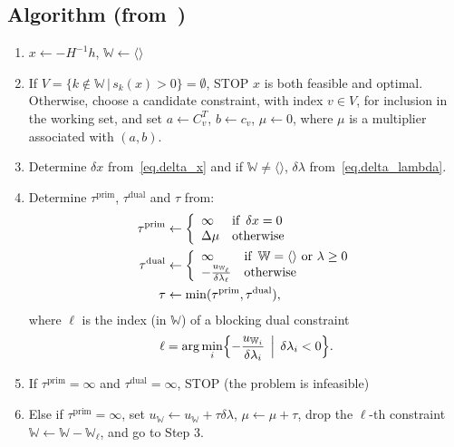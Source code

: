 \documentclass[12pt,a4paper]{article}
\begin{document}
\subsection{Algorithm (from~\cite{Goldfarb.1981})}

\begin{enumerate}
\item $x \leftarrow -H^{-1}h$, $\mathbb{W} \leftarrow \langle\rangle$
\item If $V = \{k \not\in \mathbb{W} \,|\, s_k(x) > 0\} = \emptyset$, STOP $x$
  is both feasible and optimal. Otherwise, choose a candidate constraint, with
  index $v \in V$, for inclusion in the working set, and set $a \leftarrow
  C_v^T$, $b \leftarrow c_v$, $\mu \leftarrow 0$, where $\mu$ is a multiplier
  associated with $(a,b)$.
\item Determine $\delta x$ from~\eqref{eq.delta_x} and if $\mathbb{W} \neq
  \langle\rangle$, $\delta \lambda$ from~\eqref{eq.delta_lambda}.
\item Determine $\tau^{\text{prim}}$, $\tau^{\text{dual}}$ and $\tau$ from:
  \begin{align}
    \tau^{\text{prim}} &\leftarrow \left\{
    \begin{array}{l l}
      \infty & \text{if }\, \delta x = 0 \\
      \Delta \mu & \text{otherwise}
    \end{array}
    \right. \\
    \tau^{\text{dual}} &\leftarrow \left\{
    \begin{array}{l l}
      \infty & \text{if }\, \mathbb{W} = \langle\rangle \text{ or } \lambda \geq 0 \\
      -\frac{u_{\mathbb{W}_{\ell}}}{\delta \lambda_{\ell}} & \text{otherwise}
    \end{array}
    \right. \\
    \tau &\leftarrow \min(\tau^{\text{prim}}, \tau^{\text{dual}}),
  \end{align}
  where $\ell$ is the index (in $\mathbb{W}$) of a blocking dual constraint
  \begin{align}
  \ell = \arg\min_{i}\Bigl\{-\frac{u_{\mathbb{W}_i}}{\delta \lambda_i} \, \Bigm| \, \delta \lambda_i < 0 \Bigr\}.
  \end{align}

\item If $\tau^{\text{prim}} = \infty$ and $\tau^{\text{dual}} = \infty$, STOP
  (the problem is infeasible)

\item Else if $\tau^{\text{prim}} = \infty$, set $u_{\mathbb{W}} \leftarrow
  u_{\mathbb{W}} + \tau \delta \lambda$, $\mu \leftarrow \mu + \tau$, drop the
  $\ell$-th constraint $\mathbb{W} \leftarrow \mathbb{W} - \mathbb{W}_{\ell}$,
  and go to Step 3.


\end{enumerate}
\end{document}
